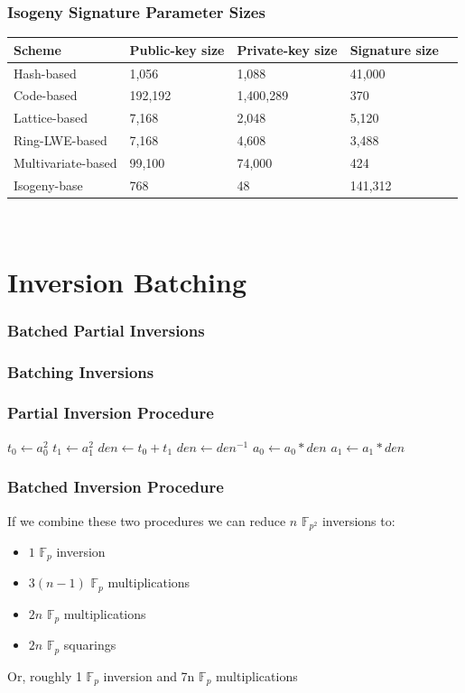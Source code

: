 \documentclass{beamer}
\begin{document}
\begin{frame}
\frametitle{Isogeny Signature Parameter Sizes}
\begin{tabular}{@{}lllll@{}}
	Scheme & Public-key size & Private-key size & Signature size\\
	\midrule
	Hash-based & 1,056 & 1,088 & 41,000\\
	Code-based & 192,192 & 1,400,289 & 370\\
	Lattice-based & 7,168 & 2,048 & 5,120\\
	Ring-LWE-based & 7,168 & 4,608 & 3,488\\
	Multivariate-based & 99,100 & 74,000 & 424\\
	\midrule
	Isogeny-base & 768 & 48 & 141,312\\
\end{tabular}\\
\end{frame}

\section{Inversion Batching}

\begin{frame}
\frametitle{Batched Partial Inversions}
\end{frame}

\begin{frame}
\frametitle{Batching Inversions}
\end{frame}

\begin{frame}[fragile]
\frametitle{Partial Inversion Procedure}
\begin{center}
\begin{algorithmic}[1]
	\State $t_0 \gets a_{0}^{2}$
	\State $t_1 \gets a_{1}^{2}$
	\State $den \gets t_0 + t_1$
	\State $den \gets den^{-1}$
	\State $a_{0} \gets a_{0} * den$
	\State $a_{1} \gets a_{1} * den$
\end{algorithmic}
\end{center}
\end{frame}

\begin{frame}[fragile]
\frametitle{Batched Inversion Procedure}
If we combine these two procedures we can reduce $n$ $\mathbb{F}_{p^{2}}$ inversions to:
\begin{itemize}
\item $1$ $\mathbb{F}_{p}$ inversion
\item $3(n-1)$ $\mathbb{F}_{p}$ multiplications
\item $2n$ $\mathbb{F}_{p}$ multiplications
\item $2n$ $\mathbb{F}_{p}$ squarings
\end{itemize}
Or, roughly 1 $\mathbb{F}_{p}$ inversion and 7n $\mathbb{F}_{p}$ multiplications
\end{frame}
\end{document}
